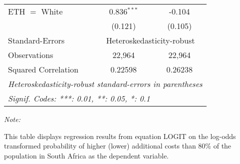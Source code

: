 \begin{table}[htbp!]
\begin{adjustbox}{width = 1\textwidth, max height = 0.95\textheight, center}
\begin{threeparttable}[b]
\begin{tabular}{lcc}
            ETH $=$ White        & 0.836$^{***}$  & -0.104\\   
                                 & (0.121)        & (0.105)\\   
            \midrule 
            Standard-Errors & \multicolumn{2}{c}{Heteroskedasticity-robust} \\ 
            Observations         & 22,964         & 22,964\\  
            Squared Correlation  & 0.22598        & 0.26238\\  
            \midrule \midrule
            \multicolumn{3}{l}{\emph{Heteroskedasticity-robust standard-errors in parentheses}}\\
            \multicolumn{3}{l}{\emph{Signif. Codes: ***: 0.01, **: 0.05, *: 0.1}}\\
         \end{tabular}
         
         \begin{tablenotes}\item \medskip \textit{Note:}
            \item This table displays regression results from equation LOGIT on the log-odds transformed probability of higher (lower) additional costs than 80\% of the population in South Africa as the dependent variable. 
         \end{tablenotes}
      \end{threeparttable}
   \end{adjustbox}
\end{table}



